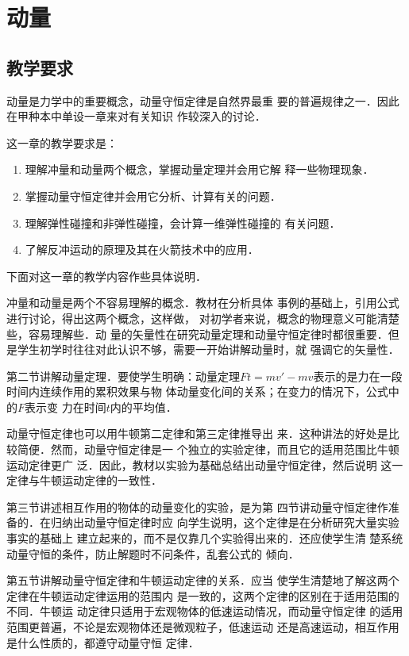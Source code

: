\chapter{动量}

\section{教学要求}

动量是力学中的重要概念，动量守恒定律是自然界最重
要的普遍规律之一．因此在甲种本中单设一章来对有关知识
作较深入的讨论．

这一章的教学要求是：
\begin{enumerate}
\item 理解冲量和动量两个概念，掌握动量定理并会用它解
释一些物理现象．
\item 掌握动量守恒定律并会用它分析、计算有关的问题．
\item 理解弹性碰撞和非弹性碰撞，会计算一维弹性碰撞的
有关问题．
\item 了解反冲运动的原理及其在火箭技术中的应用．
\end{enumerate}

下面对这一章的教学内容作些具体说明．

冲量和动量是两个不容易理解的概念．教材在分析具体
事例的基础上，引用公式进行讨论，得出这两个概念，这样做，
对初学者来说，概念的物理意义可能清楚些，容易理解些．动
量的矢量性在研究动量定理和动量守恒定律时都很重要．但
是学生初学时往往对此认识不够，需要一开始讲解动量时，就
强调它的矢量性．

第二节讲解动量定理．要使学生明确：动量定理$Ft=
mv'-mv$表示的是力在一段时间内连续作用的累积效果与物
体动量变化间的关系；在变力的情况下，公式中的$F$表示变
力在时间$t$内的平均值．

动量守恒定律也可以用牛顿第二定律和第三定律推导出
来．这种讲法的好处是比较简便．然而，动量守恒定律是一
个独立的实验定律，而且它的适用范围比牛顿运动定律更广
泛．因此，教材以实验为基础总结出动量守恒定律，然后说明
这一定律与牛顿运动定律的一致性．

第三节讲述相互作用的物体的动量变化的实验，是为第
四节讲动量守恒定律作准备的．在归纳出动量守恒定律时应
向学生说明，这个定律是在分析研究大量实验事实的基础上
建立起来的，而不是仅靠几个实验得出来的．还应使学生清
楚系统动量守恒的条件，防止解题时不问条件，乱套公式的
倾向．

第五节讲解动量守恒定律和牛顿运动定律的关系．应当
使学生清楚地了解这两个定律在牛顿运动定律运用的范围内
是一致的，这两个定律的区别在于适用范围的不同．牛顿运
动定律只适用于宏观物体的低速运动情况，而动量守恒定律
的适用范围更普遍，不论是宏观物体还是微观粒子，低速运动
还是高速运动，相互作用是什么性质的，都遵守动量守恒
定律．

